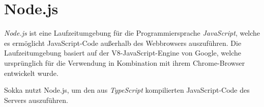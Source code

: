 \section{Node.js}

\textit{Node.js} ist eine Laufzeitumgebung für die Programmiersprache \textit{JavaScript}, welche es ermöglicht JavaScript-Code außerhalb des Webbrowsers auszuführen. Die Laufzeitumgebung basiert auf der V8-JavaScript-Engine von Google, welche ursprünglich für die Verwendung in Kombination mit ihrem Chrome-Browser entwickelt wurde. \cite{springer2013}

Sokka nutzt Node.js, um den aus \textit{TypeScript} kompilierten JavaScript-Code des Servers auszuführen.